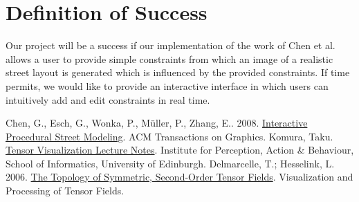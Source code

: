 \documentclass{proc}
\begin{document}
\section{Definition of Success}
Our project will be a success if our implementation of the work of Chen et al.
allows a user to provide simple constraints from which an image of a realistic
street layout is generated which is influenced by the provided constraints. If
time permits, we would like to provide an interactive interface in which users
can intuitively add and edit constraints in real time.

\begin{thebibliography}{9}
    Chen, G., Esch, G., Wonka, P., Müller, P., Zhang, E.. 2008. \href{http://www.google.com/url?q=http%3A%2F%2Fpeterwonka.net%2FPublications%2Fpdfs%2F2008.SG.Chen.InteractiveProceduralStreetModeling.pdf&sa=D&sntz=1&usg=AFQjCNGp-DPZdfTyZLHmKVeefan3jltzzw}{Interactive Procedural Street Modeling}. ACM Transactions on Graphics.
    Komura, Taku.  \href{http://www.google.com/url?q=http%3A%2F%2Fwww.inf.ed.ac.uk%2Fteaching%2Fcourses%2Fvis%2Flecture_notes%2Flecture14.pdf&sa=D&sntz=1&usg=AFQjCNGytegkIGcZJd_JM-3pzlilzPVH7g}{Tensor Visualization Lecture Notes}. Institute for Perception, Action \& Behaviour, School of Informatics, University of Edinburgh.
    Delmarcelle, T.; Hesselink, L. 2006. \href{http://www.google.com/url?q=http%3A%2F%2Fwww.inf.ethz.ch%2Fpersonal%2Fpeikert%2FSciVis%2FLiterature%2FDelmarcelleHesselink94.pdf&sa=D&sntz=1&usg=AFQjCNGIb52UifdoK_NB0oB8sU_r_rebBQ}{The Topology of Symmetric, Second-Order Tensor Fields}. Visualization and Processing of Tensor Fields.

\end{thebibliography}
\end{document}
